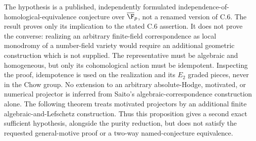 \begin{remark}
\label{c:chow-rank-reduction-scope}
The hypothesis is a published, independently formulated
independence-of-homological-equivalence conjecture over
$\overline{\F}_p$, not a renamed version of C.6.
The result proves only its implication to the stated C.6 assertion.
It does not prove the converse: realizing an arbitrary finite-field
correspondence as local monodromy of a number-field variety would
require an additional geometric construction which is not supplied.
The representative must be algebraic and homogeneous, but only
its cohomological action must be idempotent. Inspecting the proof,
idempotence is used on the realization and its $E_2$ graded pieces,
never in the Chow group. No extension to an arbitrary
absolute-Hodge, motivated, or numerical projector is inferred
from Saito's algebraic-correspondence construction alone.
The following theorem treats motivated projectors by an additional
finite algebraic-and-Lefschetz construction.
Thus this proposition gives a second exact sufficient hypothesis,
alongside the purity reduction, but does not satisfy the requested
general-motive proof or a two-way named-conjecture equivalence.
\end{remark}
